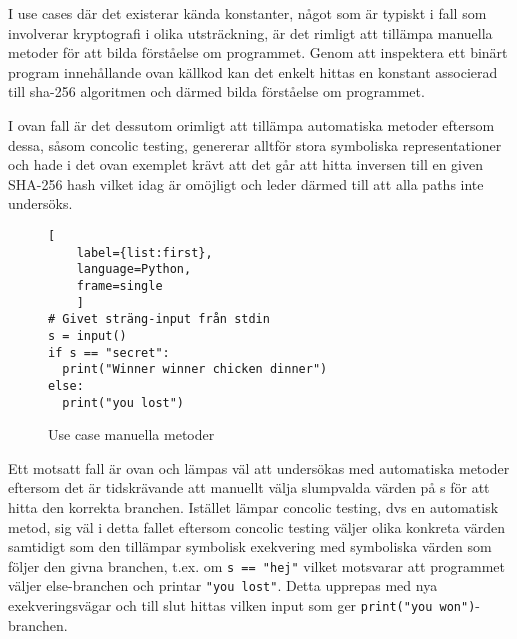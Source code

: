 I use cases där det existerar kända konstanter, något som är typiskt i fall som
involverar kryptografi i olika utsträckning, är det rimligt att tillämpa
manuella metoder för att bilda förståelse om programmet. Genom att inspektera
ett binärt program innehållande ovan källkod kan det enkelt hittas en konstant
associerad till sha-256 algoritmen och därmed bilda förståelse om programmet.

I ovan fall är det dessutom orimligt att tillämpa automatiska metoder eftersom
dessa, såsom concolic testing, genererar alltför stora symboliska
representationer och hade i det ovan exemplet krävt att det går att hitta
inversen till en given SHA-256 hash vilket idag är omöjligt och leder därmed
till att alla paths inte undersöks.

\begin{figure}
\begin{lstlisting}[
    label={list:first},
    language=Python,
    frame=single
    ]
# Givet sträng-input från stdin
s = input()
if s == "secret":
  print("Winner winner chicken dinner")
else:
  print("you lost")
\end{lstlisting}
\caption{Use case manuella metoder}
\end{figure}

Ett motsatt fall är ovan och lämpas väl att undersökas med automatiska
metoder eftersom det är tidskrävande att manuellt välja slumpvalda värden på s
för att hitta den korrekta branchen. Istället lämpar concolic testing, dvs en
automatisk metod, sig väl i detta fallet eftersom concolic testing väljer olika
konkreta värden samtidigt som den tillämpar symbolisk exekvering med symboliska
värden som följer den givna branchen, t.ex. om \lstinline{s == "hej"} vilket
motsvarar att programmet väljer else-branchen och printar \lstinline{"you lost"}. 
Detta upprepas med nya exekveringsvägar och till slut hittas vilken input som ger
\lstinline{print("you won")}-branchen. 

